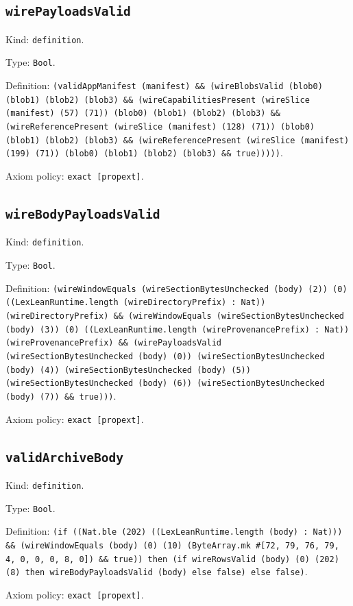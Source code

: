 \documentclass[11pt]{article}
\begin{document}
\subsection*{\texttt{wirePayloadsValid}}
\noindent Kind: \texttt{definition}.\par
\noindent Type: \texttt{Bool}.\par
\noindent Definition: \texttt{(validAppManifest (manifest) \&\& (wireBlobsValid (blob0) (blob1) (blob2) (blob3) \&\& (wireCapabilitiesPresent (wireSlice (manifest) (57) (71)) (blob0) (blob1) (blob2) (blob3) \&\& (wireReferencePresent (wireSlice (manifest) (128) (71)) (blob0) (blob1) (blob2) (blob3) \&\& (wireReferencePresent (wireSlice (manifest) (199) (71)) (blob0) (blob1) (blob2) (blob3) \&\& true)))))}.\par
\noindent Axiom policy: \texttt{exact [propext]}.\par
\subsection*{\texttt{wireBodyPayloadsValid}}
\noindent Kind: \texttt{definition}.\par
\noindent Type: \texttt{Bool}.\par
\noindent Definition: \texttt{(wireWindowEquals (wireSectionBytesUnchecked (body) (2)) (0) ((LexLeanRuntime.length (wireDirectoryPrefix) : Nat)) (wireDirectoryPrefix) \&\& (wireWindowEquals (wireSectionBytesUnchecked (body) (3)) (0) ((LexLeanRuntime.length (wireProvenancePrefix) : Nat)) (wireProvenancePrefix) \&\& (wirePayloadsValid (wireSectionBytesUnchecked (body) (0)) (wireSectionBytesUnchecked (body) (4)) (wireSectionBytesUnchecked (body) (5)) (wireSectionBytesUnchecked (body) (6)) (wireSectionBytesUnchecked (body) (7)) \&\& true)))}.\par
\noindent Axiom policy: \texttt{exact [propext]}.\par
\subsection*{\texttt{validArchiveBody}}
\noindent Kind: \texttt{definition}.\par
\noindent Type: \texttt{Bool}.\par
\noindent Definition: \texttt{(if ((Nat.ble (202) ((LexLeanRuntime.length (body) : Nat))) \&\& (wireWindowEquals (body) (0) (10) (ByteArray.mk \#[72, 79, 76, 79, 4, 0, 0, 0, 8, 0]) \&\& true)) then (if wireRowsValid (body) (0) (202) (8) then wireBodyPayloadsValid (body) else false) else false)}.\par
\noindent Axiom policy: \texttt{exact [propext]}.\par
\end{document}
